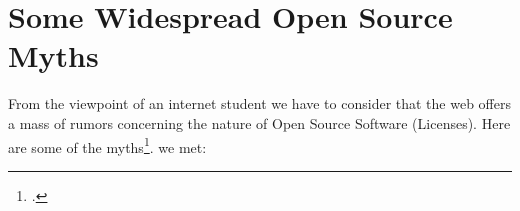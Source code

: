 %
%
%
%

%




\section{Some Widespread Open Source Myths}

From the viewpoint of an internet student we have to consider that the web
offers a mass of rumors concerning the nature of Open Source Software
(Licenses). Here are some of the myths\footcite[At least one time even a
scientific legally discussing book is talking about the \enquote{Myth around Open
Source Licenses} - although only as part of  the title: cf][1ff,
especially 209ff]{GuiOvd2006a}.
we met:
 

